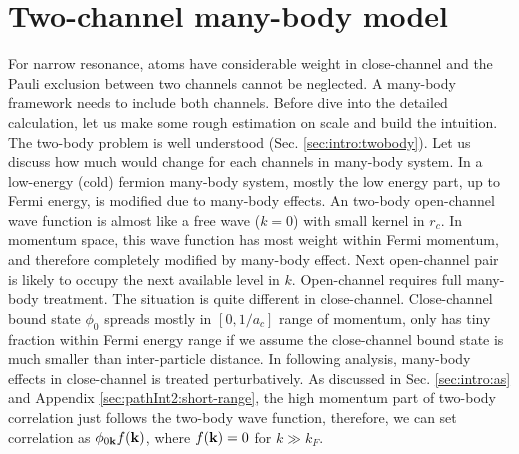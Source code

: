 
\chapter{Two-channel many-body model\label{ch:path2}}
For narrow resonance, atoms have considerable weight in close-channel and the Pauli exclusion between two channels cannot be neglected.  A many-body framework needs to include both channels.  Before dive into the detailed calculation, let us make some rough estimation on scale and build the intuition.  The two-body problem is well understood (Sec. \ref{sec:intro:twobody}).  %
Let us discuss how much would change for each channels in many-body system.  In a low-energy (cold) fermion many-body system,  mostly the low energy part, up to Fermi energy, is modified due to many-body effects.  An two-body open-channel wave function is almost like a free wave ($k=0$) with small kernel in $r_c$.  In momentum space, this wave function has most weight within Fermi momentum, and therefore completely modified by many-body effect. Next open-channel pair is likely to occupy the next available level in $k$.   Open-channel requires full many-body treatment.  The situation is quite different in close-channel.  Close-channel bound state $\phi_{0}$ spreads mostly in $[0,1/a_{c}]$ range of momentum, only has tiny fraction within Fermi energy range if we assume the close-channel bound state is much smaller than inter-particle distance. In following analysis, many-body effects in close-channel is treated perturbatively.  As discussed in Sec. \ref{sec:intro:as} and Appendix \ref{sec:pathInt2:short-range}, the high momentum part of two-body correlation just follows the two-body wave function,  therefore, we can set correlation as $\phi_{0\mathbf{k}}f(\mathbf{k})$, where $f(\mathbf{k})=0$ for $k\gg{k_{F}}$.  

